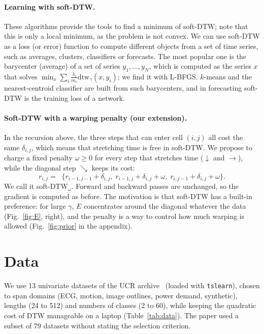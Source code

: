 \documentclass[11pt]{article}
\newcommand{\sdtw}{\mathrm{dtw}_\gamma}
\newcommand{\minop}{\mathop{\mathrm{min}^\gamma}}
\begin{document}
\paragraph{Learning with soft-DTW.}
These algorithms provide the tools to find a minimum of soft-DTW; note that this is only a local minimum, as the problem is not convex. We can use soft-DTW as a loss (or error) function to compute different objects from a set of time series, such as averages, clusters, classifiers or forecasts. The most popular one is the barycenter (average) of a set of series $y_1,\dots,y_N$, which is computed as the series $x$ that solves $\min_x\sum_i \frac{\lambda_i}{m_i}\sdtw(x,y_i)$; we find it with L-BFGS. $k$-means and the nearest-centroid classifier are built from such barycenters, and in forecasting soft-DTW is the training loss of a network.

\paragraph{Soft-DTW with a warping penalty (our extension).}
In the recursion above, the three steps that can enter cell $(i,j)$ all cost the same $\delta_{i,j}$, which means that stretching time is free in soft-DTW. We propose to charge a fixed penalty $\omega\ge0$ for every step that stretches time ($\downarrow$ and $\rightarrow$), while the diagonal step $\searrow$ keeps its cost:
\begin{equation}
r_{i,j}=\minop\{r_{i-1,j-1}+\delta_{i,j},\; r_{i-1,j}+\delta_{i,j}+\omega,\; r_{i,j-1}+\delta_{i,j}+\omega\}.
\end{equation}
We call it soft-DTW$_\omega$. Forward and backward passes are unchanged, so the gradient is computed as before. The motivation is that soft-DTW has a built-in preference: for large $\gamma$, $E$ concentrates around the diagonal whatever the data (Fig.~\ref{fig:E}, right), and the penalty is a way to control how much warping is allowed (Fig.~\ref{fig:prior} in the appendix).

\section{Data}
\label{sec:data}

We use 13 univariate datasets of the UCR archive~\cite{ucr2018} (loaded with \texttt{tslearn}), chosen to span domains (ECG, motion, image outlines, power demand, synthetic), lengths (24 to 512) and numbers of classes (2 to 60), while keeping the quadratic cost of DTW manageable on a laptop (Table~\ref{tab:data}). The paper used a subset of 79 datasets without stating the selection criterion.
\end{document}
